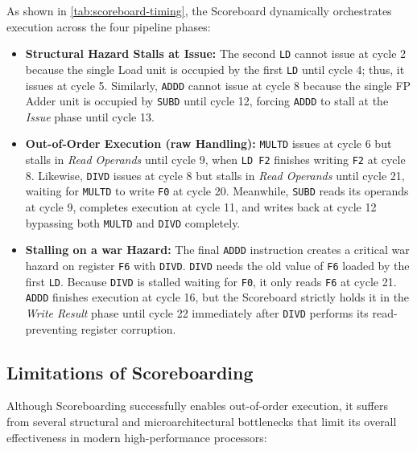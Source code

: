 As shown in \cref{tab:scoreboard-timing}, the Scoreboard dynamically orchestrates execution across the four pipeline phases:

\begin{itemize}
    \item \textbf{Structural Hazard Stalls at Issue:} The second \texttt{LD} cannot issue at cycle 2 because the single Load unit is occupied by the first \texttt{LD} until cycle 4; thus, it issues at cycle 5. Similarly, \texttt{ADDD} cannot issue at cycle 8 because the single FP Adder unit is occupied by \texttt{SUBD} until cycle 12, forcing \texttt{ADDD} to stall at the \textit{Issue} phase until cycle 13.
    \item \textbf{Out-of-Order Execution (\gls{raw} Handling):} \texttt{MULTD} issues at cycle 6 but stalls in \textit{Read Operands} until cycle 9, when \texttt{LD F2} finishes writing \texttt{F2} at cycle 8. Likewise, \texttt{DIVD} issues at cycle 8 but stalls in \textit{Read Operands} until cycle 21, waiting for \texttt{MULTD} to write \texttt{F0} at cycle 20. Meanwhile, \texttt{SUBD} reads its operands at cycle 9, completes execution at cycle 11, and writes back at cycle 12 bypassing both \texttt{MULTD} and \texttt{DIVD} completely.
    \item \textbf{Stalling on a \gls{war} Hazard:} The final \texttt{ADDD} instruction creates a critical \gls{war} hazard on register \texttt{F6} with \texttt{DIVD}. \texttt{DIVD} needs the old value of \texttt{F6} loaded by the first \texttt{LD}. Because \texttt{DIVD} is stalled waiting for \texttt{F0}, it only reads \texttt{F6} at cycle 21. \texttt{ADDD} finishes execution at cycle 16, but the Scoreboard strictly holds it in the \textit{Write Result} phase until cycle 22 immediately after \texttt{DIVD} performs its read-preventing register corruption.
\end{itemize}

\subsection{Limitations of Scoreboarding}

Although Scoreboarding successfully enables out-of-order execution, it suffers from several structural and microarchitectural bottlenecks that limit its overall effectiveness in modern high-performance processors:

